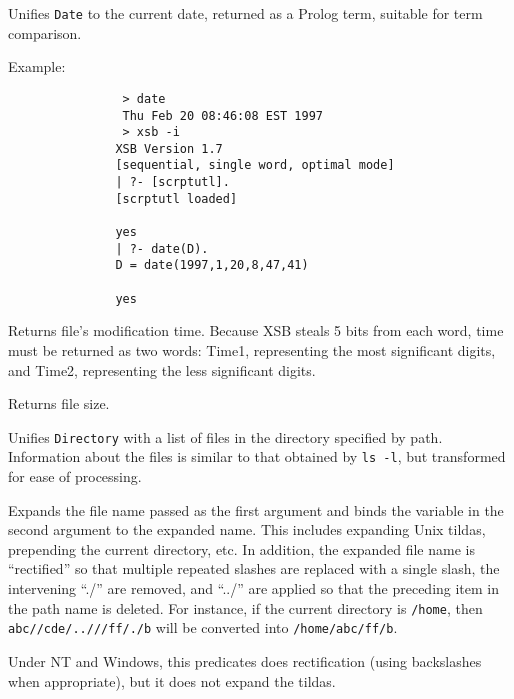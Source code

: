 \begin{description}
       Unifies {\tt Date} to the current date, returned as a Prolog
term, suitable for term comparison.

Example:
{\footnotesize
\begin{verbatim}
                > date 
                Thu Feb 20 08:46:08 EST 1997
                > xsb -i
               XSB Version 1.7
               [sequential, single word, optimal mode]
               | ?- [scrptutl].
               [scrptutl loaded]

               yes
               | ?- date(D).
               D = date(1997,1,20,8,47,41)

               yes
\end{verbatim}}


Returns file's modification time. Because 
XSB steals 5 bits from each word, time must be returned as two words:
Time1, representing the most significant digits, and Time2, representing
the less significant digits.


Returns file size.


	Unifies {\tt Directory} with a list of files in the directory
specified by path.  Information about the files is similar to that
obtained by {\tt ls -l}, but transformed for ease of processing.


Expands the file name passed as the first argument and binds the variable
in the second argument to the expanded name. This includes expanding Unix
tildas, prepending the current directory, etc. In addition, the expanded
file name is ``rectified'' so that multiple repeated slashes are replaced
with a single slash, the intervening ``./'' are removed, and ``../'' are
applied so that the preceding item in the path name is deleted. For
instance, if the current directory is {\tt /home}, then {\tt
  abc//cde/..///ff/./b} will be converted into {\tt /home/abc/ff/b}.

Under NT and Windows, this predicates does rectification (using
backslashes when appropriate), but it does not expand the tildas.


\end{description}
